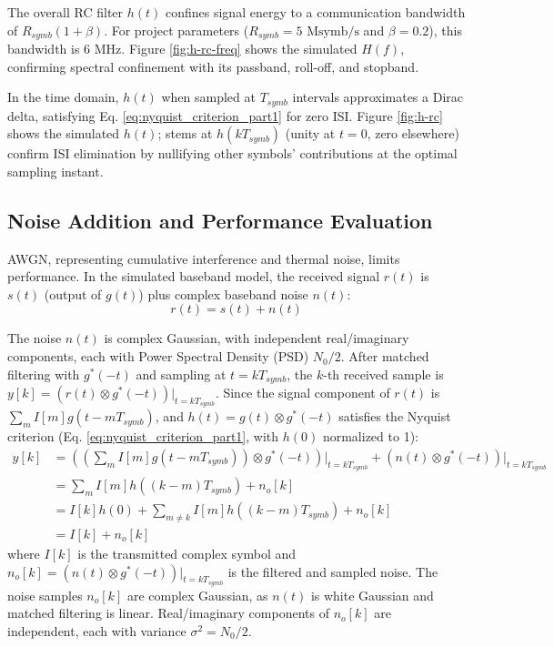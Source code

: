 \documentclass[11pt]{article}
\begin{document}
	The overall RC filter $h(t)$ confines signal energy to a communication bandwidth of $R_{symb}(1+\beta)$. For project parameters ($R_{symb} = 5 \text{ Msymb/s}$ and $\beta = 0.2$), this bandwidth is $6 \text{ MHz}$. Figure \ref{fig:h-rc-freq} shows the simulated $H(f)$, confirming spectral confinement with its passband, roll-off, and stopband.
	
	In the time domain, $h(t)$ when sampled at $T_{symb}$ intervals approximates a Dirac delta, satisfying Eq. \ref{eq:nyquist_criterion_part1} for zero ISI. Figure \ref{fig:h-rc} shows the simulated $h(t)$; stems at $h(kT_{symb})$ (unity at $t=0$, zero elsewhere) confirm ISI elimination by nullifying other symbols' contributions at the optimal sampling instant.
	
	
	\subsection{Noise Addition and Performance Evaluation}
	AWGN, representing cumulative interference and thermal noise, limits performance. In the simulated baseband model, the received signal $r(t)$ is $s(t)$ (output of $g(t)$) plus complex baseband noise $n(t)$:
	\begin{equation}
		r(t) = s(t) + n(t)
	\end{equation}
	\par
	The noise $n(t)$ is complex Gaussian, with independent real/imaginary components, each with Power Spectral Density (PSD) $N_0/2$. After matched filtering with $g^*(-t)$ and sampling at $t = kT_{symb}$, the $k$-th received sample is $y[k] = (r(t) \otimes g^*(-t))|_{t=kT_{symb}}$. Since the signal component of $r(t)$ is $\sum_m I[m]g(t-mT_{symb})$, and $h(t) = g(t) \otimes g^*(-t)$ satisfies the Nyquist criterion (Eq. \ref{eq:nyquist_criterion_part1}, with $h(0)$ normalized to 1):
	\begin{align}
		y[k] &= \left( \left(\sum_m I[m]g(t-mT_{symb})\right) \otimes g^*(-t) \right)\Big|_{t=kT_{symb}} + (n(t) \otimes g^*(-t))|_{t=kT_{symb}} \nonumber \\
		&= \sum_m I[m]h((k-m)T_{symb}) + n_o[k] \nonumber \\
		&= I[k]h(0) + \sum_{m \neq k} I[m]h((k-m)T_{symb}) + n_o[k] \nonumber \\
		&= I[k] + n_o[k] \label{eq:yk_plus_noise}
	\end{align}
	where $I[k]$ is the transmitted complex symbol and $n_o[k] = (n(t) \otimes g^*(-t))|_{t=kT_{symb}}$ is the filtered and sampled noise. The noise samples $n_o[k]$ are complex Gaussian, as $n(t)$ is white Gaussian and matched filtering is linear. Real/imaginary components of $n_o[k]$ are independent, each with variance $\sigma^2 = N_0/2$.
	
\end{document}

